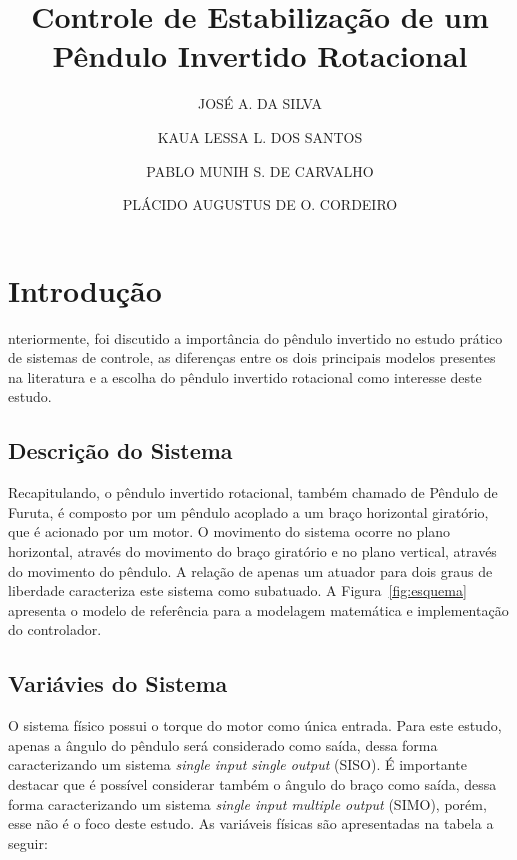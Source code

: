 \documentclass[9pt,a4paper,twocolumn,twoside]{tau-class/tau}
\title{Controle de Estabilização de um Pêndulo Invertido Rotacional}
\author[a,1]{JOSÉ A. DA SILVA}
\author[b,2]{KAUA LESSA L. DOS SANTOS }
\author[c,3]{PABLO MUNIH S. DE CARVALHO}
\author[d,4]{PLÁCIDO AUGUSTUS DE O. CORDEIRO}
\affil[a]{Engenharia da Computação, Universidade Federal de Alagoas}
\affil[b]{Engenharia da Computação, Universidade Federal de Alagoas}
\affil[c]{Engenharia da Computação, Universidade Federal de Alagoas}
\begin{document}
		
    \maketitle 
    \thispagestyle{firststyle} 
    \tauabstract 
    

\section{Introdução}
    nteriormente, foi discutido a importância do pêndulo invertido no estudo prático de sistemas de controle, as
    diferenças entre os dois principais modelos presentes na literatura e a escolha do pêndulo invertido rotacional como
    interesse deste estudo.
    
    \subsection{Descrição do Sistema}
    Recapitulando, o pêndulo invertido rotacional, também chamado de Pêndulo de Furuta, é composto por um pêndulo acoplado
    a um braço horizontal giratório, que é acionado por um motor. O movimento do sistema ocorre no plano horizontal, através
    do movimento do braço giratório e no plano vertical, através do movimento do pêndulo. A relação de apenas um atuador para
    dois graus de liberdade caracteriza este sistema como subatuado. A Figura~\ref{fig:esquema} apresenta o modelo de 
    referência para a modelagem matemática e implementação do controlador. 

    \subsection{Variávies do Sistema}
    O sistema físico possui o torque do motor como única entrada. Para este estudo, apenas a ângulo do pêndulo será considerado
    como saída, dessa forma caracterizando um sistema \textit{single input single output} (SISO). É importante destacar
    que é possível considerar também o ângulo do braço como saída, dessa forma caracterizando um sistema
    \textit{single input multiple output} (SIMO), porém, esse não é o foco deste estudo. As variáveis físicas são
    apresentadas na tabela a seguir:
\end{document}
